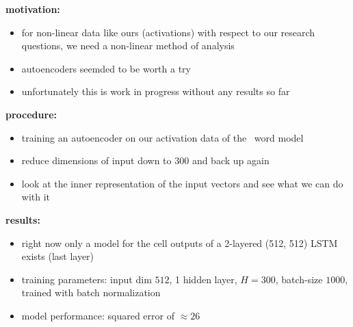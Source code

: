 \begin{frame}{\expx}
	\textbf{motivation:}
	\begin{itemize}
		\item for non-linear data like ours (activations) with respect to our research questions, we need a non-linear method of analysis
		\item autoencoders seemded to be worth a try
		\item unfortunately this is work in progress without any results so far
	\end{itemize}
	\textbf{procedure:}
	\begin{itemize}
		\item training an autoencoder on our activation data of the \hdt~word model
		\item reduce dimensions of input down to 300 and back up again
		\item look at the inner representation of the input vectors and see what we can do with it
	\end{itemize}
	\textbf{results:}
	\begin{itemize}
		\item right now only a model for the cell outputs of a 2-layered (512, 512) LSTM exists (last layer)
		\item training parameters: input dim $512$, 1 hidden layer, $H=300$, batch-size $1000$, trained with batch normalization
		\item model performance: squared error of $\approx 26$
	\end{itemize}
\end{frame}